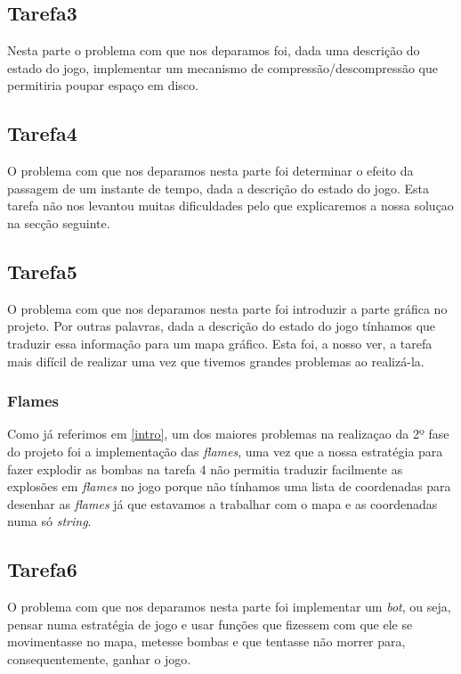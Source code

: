 \documentclass[a4paper]{report}
\begin{document}
\subsection{Tarefa3}

Nesta parte o problema com que nos deparamos foi, dada uma descrição do estado do jogo, implementar um mecanismo de compressão/descompressão que permitiria poupar espaço em disco.

\subsection{Tarefa4}

O problema com que nos deparamos nesta parte foi determinar o efeito da passagem de um instante de tempo, dada a descrição do estado do jogo. Esta tarefa não nos levantou muitas dificuldades pelo que explicaremos a nossa soluçao na secção seguinte.

\subsection{Tarefa5}

O problema com que nos deparamos nesta parte foi introduzir a parte gráfica no projeto. Por outras palavras, dada a descrição do estado do jogo tínhamos que traduzir essa informação para um mapa gráfico.
Esta foi, a nosso ver, a tarefa mais difícil de realizar uma vez que tivemos grandes problemas ao realizá-la. 

\subsubsection{Flames}

Como já referimos em \ref{intro}, um dos maiores problemas na realizaçao da 2º fase do projeto foi a implementação das \emph{flames}, uma vez que a nossa estratégia para fazer explodir as bombas na tarefa 4 não permitia traduzir facilmente as explosões em \emph{flames} no jogo porque não tínhamos uma lista de coordenadas para desenhar as \emph{flames} já que estavamos a trabalhar com o mapa e as coordenadas numa só \emph{string}.

\subsection{Tarefa6}

O problema com que nos deparamos nesta parte foi implementar um \emph{bot}, ou seja, pensar numa estratégia de jogo e usar funções que fizessem com que ele se movimentasse no mapa, metesse bombas e que tentasse não morrer para, consequentemente, ganhar o jogo. 
\end{document}
